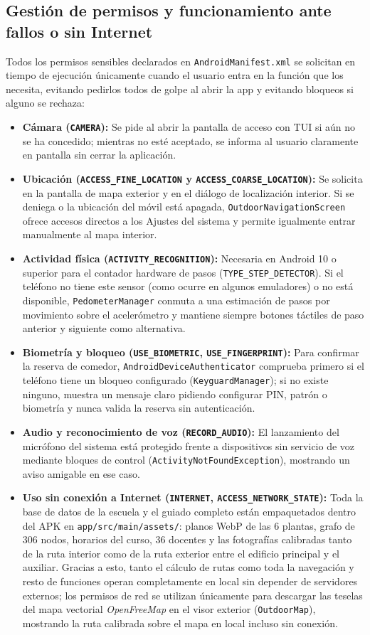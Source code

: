 \documentclass[11pt,a4paper]{article}
\begin{document}
\subsection{Gestión de permisos y funcionamiento ante fallos o sin Internet}
Todos los permisos sensibles declarados en \texttt{AndroidManifest.xml} se solicitan en tiempo de ejecución únicamente cuando el usuario entra en la función que los necesita, evitando pedirlos todos de golpe al abrir la app y evitando bloqueos si alguno se rechaza:
\begin{itemize}[leftmargin=1.8em]
    \item \textbf{Cámara (\texttt{CAMERA}):} Se pide al abrir la pantalla de acceso con TUI si aún no se ha concedido; mientras no esté aceptado, se informa al usuario claramente en pantalla sin cerrar la aplicación.
    \item \textbf{Ubicación (\texttt{ACCESS\_FINE\_LOCATION} y \texttt{ACCESS\_COARSE\_LOCATION}):} Se solicita en la pantalla de mapa exterior y en el diálogo de localización interior. Si se deniega o la ubicación del móvil está apagada, \texttt{OutdoorNavigationScreen} ofrece accesos directos a los Ajustes del sistema y permite igualmente entrar manualmente al mapa interior.
    \item \textbf{Actividad física (\texttt{ACTIVITY\_RECOGNITION}):} Necesaria en Android 10 o superior para el contador hardware de pasos (\texttt{TYPE\_STEP\_DETECTOR}). Si el teléfono no tiene este sensor (como ocurre en algunos emuladores) o no está disponible, \texttt{PedometerManager} conmuta a una estimación de pasos por movimiento sobre el acelerómetro y mantiene siempre botones táctiles de paso anterior y siguiente como alternativa.
    \item \textbf{Biometría y bloqueo (\texttt{USE\_BIOMETRIC}, \texttt{USE\_FINGERPRINT}):} Para confirmar la reserva de comedor, \texttt{AndroidDeviceAuthenticator} comprueba primero si el teléfono tiene un bloqueo configurado (\texttt{KeyguardManager}); si no existe ninguno, muestra un mensaje claro pidiendo configurar PIN, patrón o biometría y nunca valida la reserva sin autenticación.
    \item \textbf{Audio y reconocimiento de voz (\texttt{RECORD\_AUDIO}):} El lanzamiento del micrófono del sistema está protegido frente a dispositivos sin servicio de voz mediante bloques de control (\texttt{ActivityNotFoundException}), mostrando un aviso amigable en ese caso.
    \item \textbf{Uso sin conexión a Internet (\texttt{INTERNET}, \texttt{ACCESS\_NETWORK\_STATE}):} Toda la base de datos de la escuela y el guiado completo están empaquetados dentro del APK en \texttt{app/src/main/assets/}: planos WebP de las 6 plantas, grafo de 306 nodos, horarios del curso, 36 docentes y las fotografías calibradas tanto de la ruta interior como de la ruta exterior entre el edificio principal y el auxiliar. Gracias a esto, tanto el cálculo de rutas como toda la navegación y resto de funciones operan completamente en local sin depender de servidores externos; los permisos de red se utilizan únicamente para descargar las teselas del mapa vectorial \textit{OpenFreeMap} en el visor exterior (\texttt{OutdoorMap}), mostrando la ruta calibrada sobre el mapa en local incluso sin conexión.

\end{itemize}
\end{document}
